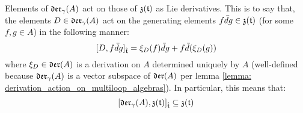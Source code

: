         \begin{lemma} \label{lemma: derivation_action_on_toroidal_centres}
            Elements of $\mathfrak{der}_{\gamma}(A)$ act on those of $\mathfrak{z}(\mathfrak{t})$ as Lie derivatives. This is to say that, the elements $D \in \mathfrak{der}_{\gamma}(A)$ act on the generating elements $f \bar{d}g \in \mathfrak{z}(\mathfrak{t})$ (for some $f, g \in A$) in the following manner:
                $$[D, f \bar{d}g]_{\hat{\mathfrak{t}}} = \xi_D(f) \bar{d}g + f \bar{d}(\xi_D(g))$$
            where $\xi_D \in \mathfrak{der}(A)$ is a derivation on $A$ determined uniquely by $A$ (well-defined because $\mathfrak{der}_{\gamma}(A)$ is a vector subspace of $\mathfrak{der}(A)$ per lemma \ref{lemma: derivation_action_on_multiloop_algebras}). In particular, this means that:
                $$[\mathfrak{der}_{\gamma}(A), \mathfrak{z}(\mathfrak{t})]_{\hat{\mathfrak{t}}} \subseteq \mathfrak{z}(\mathfrak{t})$$
        \end{lemma}
